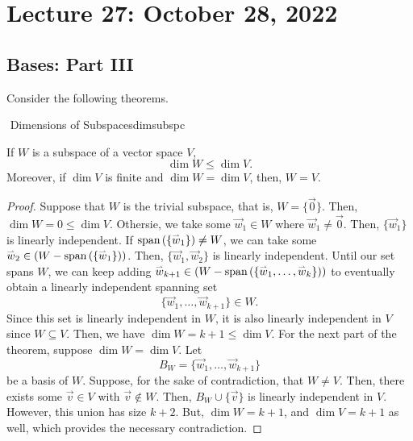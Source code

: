 \pagebreak

\section{Lecture 27: October 28, 2022}

    \subsection{Bases: Part III}

        Consider the following theorems.
        \begin{theorem}{\Stop\,\,Dimensions of Subspaces}{dimsubspc}

            If \(W\) is a subspace of a vector space \(V\),
            \begin{equation*}
                \dim W\leq \dim V.
            \end{equation*}
            Moreover, if \(\dim V\) is finite and \(\dim W=\dim V\), then, \(W=V\).
            \begin{proof}
                Suppose that \(W\) is the trivial subspace, that is, \(W=\{\vec{0}\}\). Then, \(\dim W=0\leq\dim V\). Othersie, we take some \(\vec{w}_1\in W\) where \(\vec{w}_1\neq\vec{0}\). Then, \(\{\vec{w}_1\}\) is linearly independent. If \(\text{span\,}(\{\overset{_{\rightharpoonup}}{w}_1\})\neq W\), we can take some \(\overset{_{\rightharpoonup}}{w}_2\in (W-\text{span\,}(\{\overset{_{\rightharpoonup}}{w}_1\}))\). Then, \(\{\vec{w}_1,\vec{w}_2\}\) is linearly independent. Until our set spans \(W\), we can keep adding \(\overset{_{\rightharpoonup}}{w}_{k+1}\in (W-\text{span\,}(\{\overset{_{\rightharpoonup}}{w}_1,\ldots,\overset{_{\rightharpoonup}}{w}_k\}))\) to eventually obtain a linearly independent spanning set
                \begin{equation*}
                    \{\vec{w}_1,\ldots,\vec{w}_{k+1}\}\in W.
                \end{equation*}
                Since this set is linearly independent in \(W\), it is also linearly independent in \(V\) since \(W\subseteq V\). Then, we have \(\dim W=k+1\leq \dim V\). For the next part of the theorem, suppose \(\dim W=\dim V\). Let
                \begin{equation*}
                    B_W=\{\vec{w}_1,\ldots,\vec{w}_{k+1}\}
                \end{equation*}
                be a basis of \(W\). Suppose, for the sake of contradiction, that \(W\neq V\). Then, there exists some \(\vec{v}\in V\) with \(\vec{v}\nin W\). Then, \(B_W\cup\{\vec{v}\}\) is linearly independent in \(V\). However, this union has size \(k+2\). But, \(\dim W=k+1\), and \(\dim V=k+1\) as well, which provides the necessary contradiction.
            \end{proof}
            
        \end{theorem}
